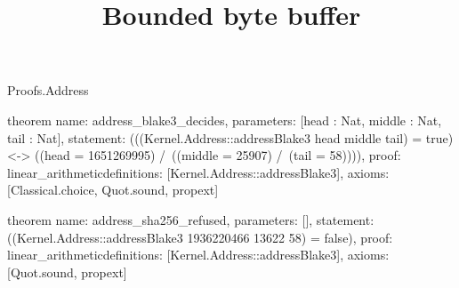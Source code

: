 \begin{lexlean}{Proofs.Address}
\title{Bounded byte buffer}
\begin{semanticmodule}
theorem{
  name: address_blake3_decides,
  parameters: [head : Nat, middle : Nat, tail : Nat],
  statement: (((Kernel.Address::addressBlake3 head middle tail) = true) <-> ((head = 1651269995) /\ ((middle = 25907) /\ (tail = 58)))),
  proof: linear_arithmetic{definitions: [Kernel.Address::addressBlake3]},
  axioms: [Classical.choice, Quot.sound, propext]
}

theorem{
  name: address_sha256_refused,
  parameters: [],
  statement: ((Kernel.Address::addressBlake3 1936220466 13622 58) = false),
  proof: linear_arithmetic{definitions: [Kernel.Address::addressBlake3]},
  axioms: [Quot.sound, propext]
}
\end{semanticmodule}
\end{lexlean}
